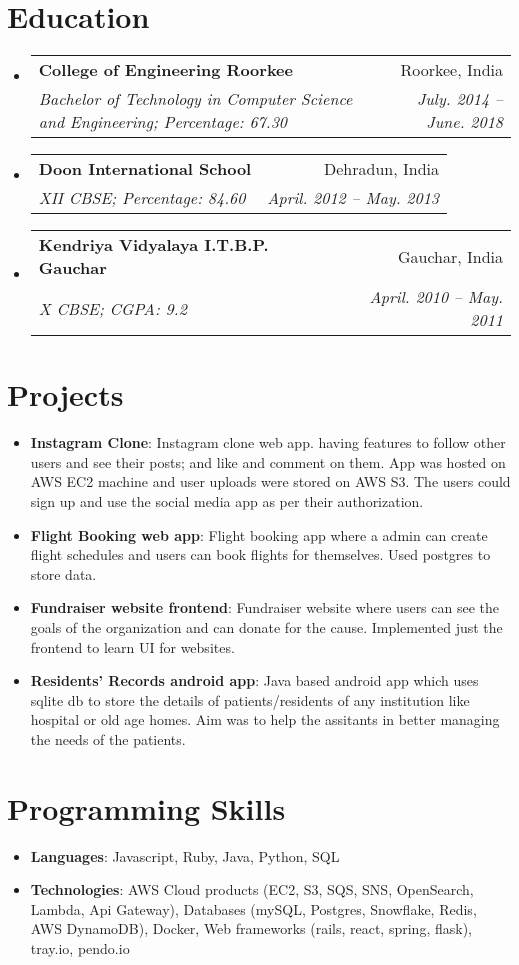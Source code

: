 \documentclass[a4paper,11pt]{article}
\makeatletter
\newcommand{\resumeItem}[2]{
  \item\small{
    \textbf{#1}{: #2 \vspace{-2pt}}
  }
}
\newcommand{\resumeSubheading}[4]{
  \vspace{-1pt}\item
    \begin{tabular*}{0.97\textwidth}[t]{l@{\extracolsep{\fill}}r}
      \textbf{#1} & #2 \\
      \textit{\small#3} & \textit{\small #4} \\
    \end{tabular*}\vspace{-5pt}
}
\newcommand{\resumeSubItem}[2]{\resumeItem{#1}{#2}\vspace{-4pt}}
\newcommand{\resumeSubHeadingListStart}{\begin{itemize}[leftmargin=*]}
\newcommand{\resumeSubHeadingListEnd}{\end{itemize}}
\newcommand{\resumeItemListStart}{\begin{itemize}}
\newcommand{\resumeItemListEnd}{\end{itemize}\vspace{-5pt}}
\makeatother
\begin{document}
\section{Education}
  \resumeSubHeadingListStart
    \resumeSubheading
      {College of Engineering Roorkee}{Roorkee, India}
      {Bachelor of Technology in Computer Science and Engineering;  Percentage: 67.30}{July. 2014 -- June. 2018}
    \resumeSubheading
      {Doon International School}{Dehradun, India}
      {XII CBSE;  Percentage: 84.60}{April. 2012 -- May. 2013}
    \resumeSubheading
      {Kendriya Vidyalaya I.T.B.P. Gauchar}{Gauchar, India}
      {X CBSE;  CGPA: 9.2}{April. 2010 -- May. 2011}
  \resumeSubHeadingListEnd





\section{Projects}
  \resumeSubHeadingListStart
    \resumeSubItem{Instagram Clone}
      {Instagram clone web app. having features to follow other users and see their posts; and like and comment on them. App was hosted on AWS EC2 machine and user uploads were stored on AWS S3. The users could sign up and use the social media app as per their authorization.}
    \resumeSubItem{Flight Booking web app}
      {Flight booking app where a admin can create flight schedules and users can book flights for themselves. Used postgres to store data.}
    \resumeSubItem{Fundraiser website frontend}
      {Fundraiser website where users can see the goals of the organization and can donate for the cause. Implemented just the frontend to learn UI for websites.}
    \resumeSubItem{Residents' Records android app}
      {Java based android app which uses sqlite db to store the details of patients/residents of any institution like hospital or old age homes. Aim was to help the assitants in better managing the needs of the patients.}
  \resumeSubHeadingListEnd





\section{Programming Skills}
  \resumeItemListStart
    \resumeItem{Languages}
      {Javascript, Ruby, Java, Python, SQL}
    \resumeItem{Technologies}
      {AWS Cloud products (EC2, S3, SQS, SNS, OpenSearch, Lambda, Api Gateway), Databases (mySQL, Postgres, Snowflake, Redis, AWS DynamoDB), Docker, Web frameworks (rails, react, spring, flask), tray.io, pendo.io }
  \resumeItemListEnd





\end{document}
